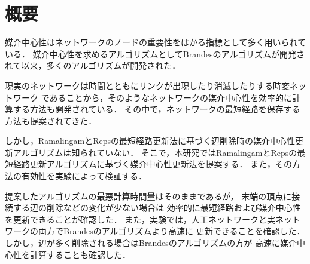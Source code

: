 \chapter*{概要}

媒介中心性はネットワークのノードの重要性をはかる指標として多く用いられている．
媒介中心性を求めるアルゴリズムとしてBrandesのアルゴリズムが開発されて以来，多くのアルゴリズムが開発された．

現実のネットワークは時間とともにリンクが出現したり消滅したりする時変ネットワーク
であることから，そのようなネットワークの媒介中心性を効率的に計算する方法も開発されている．
その中で，ネットワークの最短経路を保存する方法も提案されてきた．

しかし，RamalingamとRepsの最短経路更新法に基づく辺削除時の媒介中心性更新アルゴリズムは知られていない．
そこで，本研究ではRamalingamとRepsの最短経路更新アルゴリズムに基づく媒介中心性更新法を提案する．
また，その方法の有効性を実験によって検証する．

提案したアルゴリズムの最悪計算時間量はそのままであるが，
末端の頂点に接続する辺の削除などの変化が少ない場合は
効率的に最短経路および媒介中心性を更新できることが確認した．
また，実験では，人工ネットワークと実ネットワークの両方でBrandesのアルゴリズムより高速に
更新できることを確認した．しかし，辺が多く削除される場合はBrandesのアルゴリズムの方が
高速に媒介中心性を計算することも確認した．
